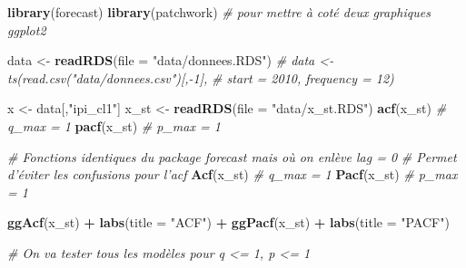 \documentclass[french]{article}
\newenvironment{Shaded}{\begin{snugshade}}{\end{snugshade}}
\newcommand{\CommentTok}[1]{\textcolor[rgb]{0.56,0.35,0.01}{\textit{#1}}}
\newcommand{\DataTypeTok}[1]{\textcolor[rgb]{0.13,0.29,0.53}{#1}}
\newcommand{\KeywordTok}[1]{\textcolor[rgb]{0.13,0.29,0.53}{\textbf{#1}}}
\newcommand{\NormalTok}[1]{#1}
\newcommand{\OperatorTok}[1]{\textcolor[rgb]{0.81,0.36,0.00}{\textbf{#1}}}
\newcommand{\StringTok}[1]{\textcolor[rgb]{0.31,0.60,0.02}{#1}}
\begin{document}
\begin{Shaded}
\begin{Highlighting}[]
\KeywordTok{library}\NormalTok{(forecast)}
\KeywordTok{library}\NormalTok{(patchwork) }\CommentTok{# pour mettre à coté deux graphiques ggplot2}

\NormalTok{data <-}\StringTok{ }\KeywordTok{readRDS}\NormalTok{(}\DataTypeTok{file =} \StringTok{"data/donnees.RDS"}\NormalTok{)}
\CommentTok{# data <- ts(read.csv("data/donnees.csv")[,-1],}
\CommentTok{#          start = 2010, frequency = 12)}

\NormalTok{x <-}\StringTok{ }\NormalTok{data[,}\StringTok{"ipi_cl1"}\NormalTok{]}
\NormalTok{x_st <-}\StringTok{ }\KeywordTok{readRDS}\NormalTok{(}\DataTypeTok{file =} \StringTok{"data/x_st.RDS"}\NormalTok{)}
\KeywordTok{acf}\NormalTok{(x_st) }\CommentTok{# q_max = 1}
\KeywordTok{pacf}\NormalTok{(x_st) }\CommentTok{# p_max = 1}

\CommentTok{# Fonctions identiques du package forecast mais où on enlève lag = 0}
\CommentTok{# Permet d'éviter les confusions pour l'acf}
\KeywordTok{Acf}\NormalTok{(x_st) }\CommentTok{# q_max = 1}
\KeywordTok{Pacf}\NormalTok{(x_st) }\CommentTok{# p_max = 1}

\KeywordTok{ggAcf}\NormalTok{(x_st) }\OperatorTok{+}\StringTok{ }\KeywordTok{labs}\NormalTok{(}\DataTypeTok{title =} \StringTok{"ACF"}\NormalTok{) }\OperatorTok{+}
\StringTok{    }\KeywordTok{ggPacf}\NormalTok{(x_st) }\OperatorTok{+}\StringTok{ }\KeywordTok{labs}\NormalTok{(}\DataTypeTok{title =} \StringTok{"PACF"}\NormalTok{)}

\CommentTok{# On va tester tous les modèles pour q <= 1, p <= 1}


\end{Highlighting}
\end{Shaded}
\end{document}
